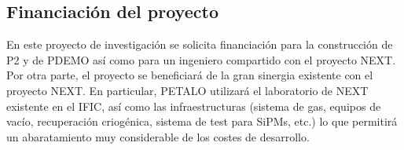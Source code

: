 \subsection*{Financiación del proyecto}

En este proyecto de investigación se solicita financiación para la construcción de P2 y de PDEMO así como para un ingeniero compartido con el proyecto NEXT. Por otra parte, el proyecto se beneficiará de la gran sinergia existente con el proyecto NEXT. En particular, PETALO utilizará el laboratorio de NEXT existente en el IFIC, así como las infraestructuras (sistema de gas, equipos de vacío, recuperación criogénica, sistema de test para SiPMs, etc.) lo que permitirá un abaratamiento muy considerable de los costes de desarrollo. 

%
%
%
%
%
%
%
%
%
%
%

























